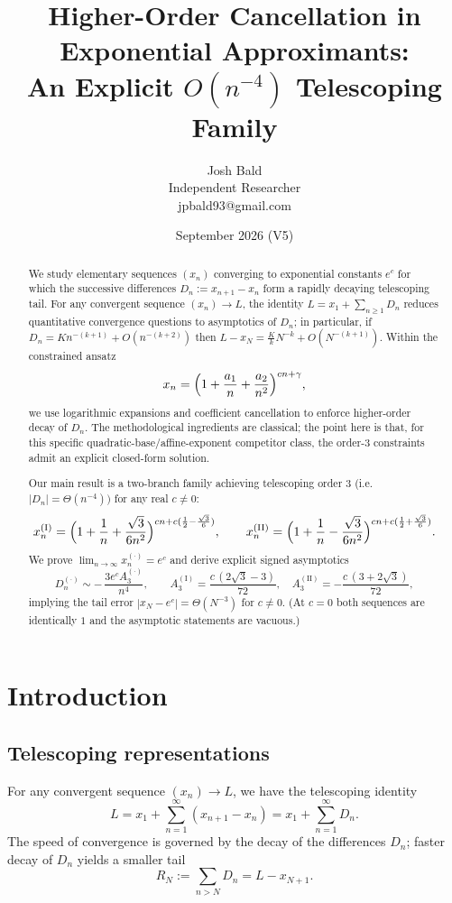 \documentclass[11pt]{article}
\title{Higher-Order Cancellation in Exponential Approximants:\\
An Explicit $O(n^{-4})$ Telescoping Family}
\author{Josh Bald\\ \small Independent Researcher\\ \small jpbald93@gmail.com}
\date{September 2026 \quad (V5)}
\theoremstyle{definition}
\begin{document}
\maketitle

\begin{abstract}
We study elementary sequences $(x_n)$ converging to exponential constants $e^{c}$
for which the successive differences $D_n := x_{n+1}-x_n$ form a rapidly decaying
telescoping tail. For any convergent sequence $(x_n)\to L$, the identity
$L = x_1 + \sum_{n\ge1} D_n$ reduces quantitative convergence questions to
asymptotics of $D_n$; in particular, if $D_n = K n^{-(k+1)} + O(n^{-(k+2)})$ then
$L - x_N = \tfrac{K}{k} N^{-k} + O(N^{-(k+1)})$. Within the constrained ansatz
\[
  x_n = \Bigl(1 + \frac{a_1}{n} + \frac{a_2}{n^2}\Bigr)^{cn+\gamma},
\]
we use logarithmic expansions and coefficient cancellation to enforce higher-order
decay of $D_n$. The methodological ingredients are classical; the point here is
that, for this specific quadratic-base/affine-exponent competitor class, the
order-$3$ constraints admit an explicit closed-form solution.

Our main result is a two-branch family achieving telescoping order $3$
(i.e.\ $|D_n| = \Theta(n^{-4}))$ for any real $c \neq 0$:
\[
  x_n^{(\mathrm{I})} = \Bigl(1+\frac1n+\frac{\sqrt3}{6n^2}\Bigr)^{cn+c(\frac12-\frac{\sqrt3}{6})},
  \qquad
  x_n^{(\mathrm{II})} = \Bigl(1+\frac1n-\frac{\sqrt3}{6n^2}\Bigr)^{cn+c(\frac12+\frac{\sqrt3}{6})}.
\]
We prove $\lim_{n\to\infty} x_n^{(\cdot)} = e^{c}$ and derive explicit signed
asymptotics
\[
  D_n^{(\cdot)} \sim -\,\frac{3e^{c}A_3^{(\cdot)}}{n^{4}},
  \qquad
  A_3^{(\mathrm{I})} = \frac{c\,(2\sqrt3-3)}{72},\quad
  A_3^{(\mathrm{II})} = -\frac{c\,(3+2\sqrt3)}{72},
\]
implying the tail error $|x_N - e^{c}| = \Theta(N^{-3})$ for $c\neq0$. (At $c=0$
both sequences are identically $1$ and the asymptotic statements are vacuous.)
\end{abstract}

\section{Introduction}

\subsection{Telescoping representations}
For any convergent sequence $(x_n)\to L$, we have the telescoping identity
\[
  L = x_1 + \sum_{n=1}^{\infty}(x_{n+1}-x_n) = x_1 + \sum_{n=1}^{\infty} D_n .
\]
The speed of convergence is governed by the decay of the differences $D_n$;
faster decay of $D_n$ yields a smaller tail
\[
  R_N := \sum_{n>N} D_n = L - x_{N+1}.
\]
\end{document}
